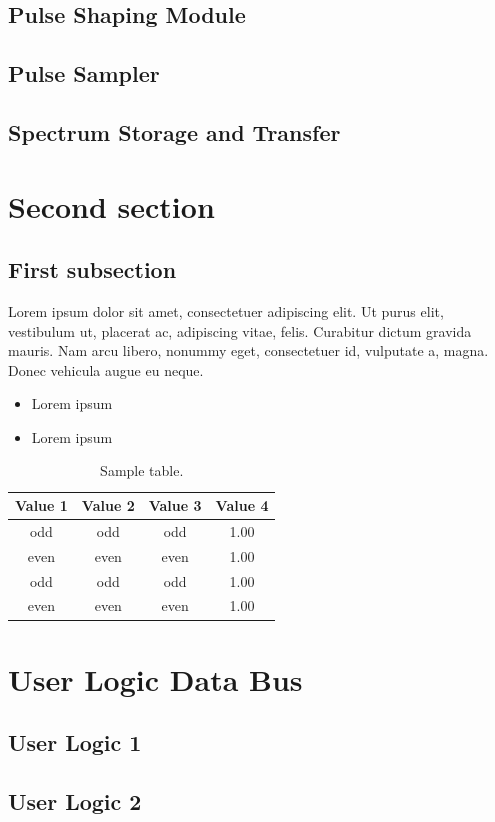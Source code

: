 \documentclass[12pt]{article}
\begin{document}
\subsection{Pulse Shaping Module}
\subsection{Pulse Sampler}
\subsection{Spectrum Storage and Transfer}
\section{Second section}

\fullboxbegin
\lipsum[1]
\fullboxend

\lipsum[1]

\subsection{First subsection}
\lipsum[1]

\leftboxbegin
Lorem ipsum dolor sit amet, consectetuer adipiscing elit. Ut purus elit, vestibulum ut, placerat ac, adipiscing vitae, felis. Curabitur dictum gravida mauris. Nam arcu libero, nonummy eget, consectetuer id, vulputate a, magna. Donec vehicula augue eu neque.
\leftboxend

\lipsum[1-2]

\rightboxbegin
\begin{itemize}
	\item Lorem ipsum
	\item Lorem ipsum
\end{itemize}
\rightboxend
\lipsum[1]
\begin{table}[!h]
	\centering
	\caption{Sample table.}
	\begin{tabular}{cccc}
		\toprule
		Value 1 & Value 2 & Value 3 & Value 4 \\
		\midrule
		odd     & odd     & odd     & 1.00    \\
		even    & even    & even    & 1.00    \\
		odd     & odd     & odd     & 1.00    \\
		even    & even    & even    & 1.00    \\
		\bottomrule
	\end{tabular}
\end{table}

\lipsum[1]

\lipsum[1]
\frameboxend

\appendix
\section{User Logic Data Bus}\label{appendix:user_logic}
\subsection{User Logic 1}\label{appendix:user_logic_1}
\lipsum[1]
\subsection{User Logic 2}\label{appendix:user_logic_2}
\lipsum[1]
\end{document}
